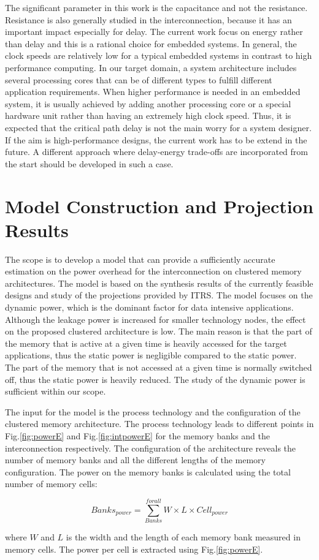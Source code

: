 The significant parameter in this work is the capacitance and not the resistance.
Resistance is also generally studied in the interconnection, because it has an important impact especially for
delay. 
The current work focus on energy rather than delay and this is a rational choice for embedded systems.
In general, the clock speeds are relatively low for a typical embedded systems in contrast to high performance computing.
In our target domain, a system architecture includes several processing cores that can be of different types to fulfill different application requirements.
When higher performance is needed in an embedded system, it is usually achieved by adding another processing core or a special hardware unit rather than having an extremely high clock speed.
Thus, it is expected that the critical path delay is not the main worry for a system designer.
If the aim is high-performance designs, the current work has to be extend in the future.
A different approach where delay-energy trade-offs are incorporated
from the start should be developed in such a case.

\section{Model Construction and Projection Results}
\label{resultsE}

 The scope is to develop a model that can provide a sufficiently accurate estimation on the power overhead for the interconnection on clustered memory architectures.
 The model is based on the synthesis results of the currently feasible designs and study of the projections provided by ITRS.
 The model focuses on the dynamic power, which is the dominant factor for data intensive applications.
 Although the leakage power is increased for smaller technology nodes, the effect on the proposed clustered architecture is low.
 The main reason is that the part of the memory that is active at a given time is heavily accessed for the target applications, thus the static power is negligible compared to the static power.
 The part of the memory that is not accessed at a given time is normally switched off, thus the static power is heavily reduced. 
 The study of the dynamic power is sufficient within our scope.
 
 The input for the model is the process technology and the configuration of the clustered memory architecture.
 The process technology leads to different points in Fig.\ref{fig:powerE} and Fig.\ref{fig:intpowerE} for the memory banks and the interconnection respectively.
 The configuration of the architecture reveals the number of memory banks and all the different lengths of the memory configuration.
 The power on the memory banks is calculated using the total number of memory cells:
 \begin{center}
 $$ Banks_{power} = \sum_{Banks}^{for all} W \times L \times Cell_{power} $$
 \end{center}
  where $W$ and $L$ is the width and the length of each memory bank measured in memory cells. The power per cell is extracted using Fig.\ref{fig:powerE}.
  
